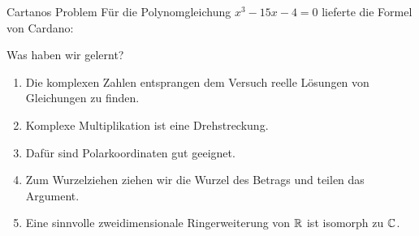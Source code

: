 \begin{frame}{Cartanos Problem}
  Für die Polynomgleichung $x^3-15x-4=0$ lieferte die Formel von Cardano:
\end{frame}
\begin{frame}{Was haben wir gelernt?}
  \begin{enumerate}
    \item<1->{ Die komplexen Zahlen entsprangen dem Versuch reelle Lösungen von Gleichungen zu finden.}
    \item<2->{Komplexe Multiplikation ist eine Drehstreckung.}
    \item <3->{Dafür sind Polarkoordinaten gut geeignet.}
    \item <4->{ Zum Wurzelziehen ziehen wir die Wurzel des Betrags und teilen das Argument.}
    \item <5->{Eine sinnvolle zweidimensionale Ringerweiterung von $\mathbb{R}$ ist isomorph zu $\mathbb{C}$.} 
  \end{enumerate}
\end{frame}

